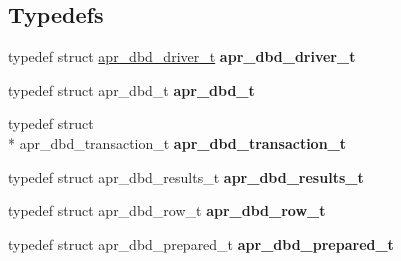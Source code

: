 \subsection*{Typedefs}
\begin{DoxyCompactItemize}
\item 
\hypertarget{group___a_p_r___util___d_b_d_ga91778287e3cd1b8ef8719ca2655e2bc8}{typedef struct \hyperlink{structapr__dbd__driver__t}{apr\-\_\-dbd\-\_\-driver\-\_\-t} {\bfseries apr\-\_\-dbd\-\_\-driver\-\_\-t}}\label{group___a_p_r___util___d_b_d_ga91778287e3cd1b8ef8719ca2655e2bc8}

\item 
\hypertarget{group___a_p_r___util___d_b_d_ga4738c1f6340184987fc7806522c18ab8}{typedef struct apr\-\_\-dbd\-\_\-t {\bfseries apr\-\_\-dbd\-\_\-t}}\label{group___a_p_r___util___d_b_d_ga4738c1f6340184987fc7806522c18ab8}

\item 
\hypertarget{group___a_p_r___util___d_b_d_ga92eb10d7ec8fdb3a39a7d6fdfffdf8fb}{typedef struct \\*
apr\-\_\-dbd\-\_\-transaction\-\_\-t {\bfseries apr\-\_\-dbd\-\_\-transaction\-\_\-t}}\label{group___a_p_r___util___d_b_d_ga92eb10d7ec8fdb3a39a7d6fdfffdf8fb}

\item 
\hypertarget{group___a_p_r___util___d_b_d_ga6765891011818912e1b52fef773bfce6}{typedef struct apr\-\_\-dbd\-\_\-results\-\_\-t {\bfseries apr\-\_\-dbd\-\_\-results\-\_\-t}}\label{group___a_p_r___util___d_b_d_ga6765891011818912e1b52fef773bfce6}

\item 
\hypertarget{group___a_p_r___util___d_b_d_gab890e4650a1de51725142318825103a5}{typedef struct apr\-\_\-dbd\-\_\-row\-\_\-t {\bfseries apr\-\_\-dbd\-\_\-row\-\_\-t}}\label{group___a_p_r___util___d_b_d_gab890e4650a1de51725142318825103a5}

\item 
\hypertarget{group___a_p_r___util___d_b_d_ga1f1179c6480a2ee0134f2cb881106cd3}{typedef struct apr\-\_\-dbd\-\_\-prepared\-\_\-t {\bfseries apr\-\_\-dbd\-\_\-prepared\-\_\-t}}\label{group___a_p_r___util___d_b_d_ga1f1179c6480a2ee0134f2cb881106cd3}

\end{DoxyCompactItemize}
